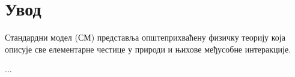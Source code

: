 ﻿%

\chapter{Увод} %

\label{Увод} %


Стандардни модел (СМ) представља општеприхваћену физичку теорију која описује све елементарне честице у природи и њихове међусобне интеракције.

...
